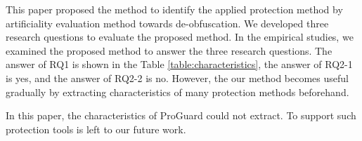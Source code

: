 \documentclass[conference]{IEEEtran}
\begin{document}
This paper proposed the method to identify the applied protection
method by artificiality evaluation method towards de-obfuscation.  We
developed three research questions to evaluate the proposed method.
In the empirical studies, we examined the proposed method to answer
the three research questions.  The answer of RQ1 is shown in the
Table \ref{table:characteristics}, the answer of RQ2-1 is yes, and the
answer of RQ2-2 is no.  However, the our method becomes useful
gradually by extracting characteristics of many protection methods
beforehand.

In this paper, the characteristics of ProGuard could not extract.
To support such protection tools is left to our future work.






\end{document}
